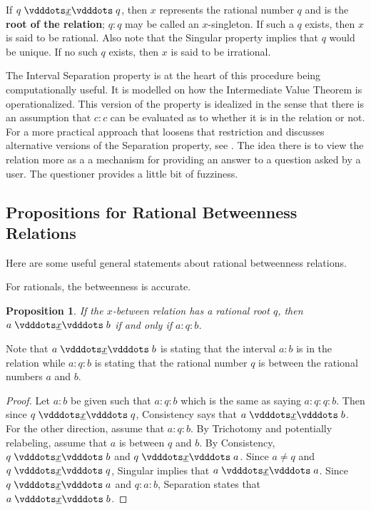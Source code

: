 \documentclass{rmj-public}
\newtheorem{proposition}{Proposition}[section]
\begin{document}
If $q \xrel q$, then $x$ represents the rational number $q$ and is the \textbf{root of the relation}; $q:q$ may be called an $x$-singleton. If such a $q$ exists, then $x$ is said to be rational. Also note that the Singular property implies that $q$ would be unique. If no such $q$ exists, then $x$ is said to be irrational. 

The Interval Separation property is at the heart of this procedure being computationally useful. It is modelled on how the Intermediate Value Theorem is operationalized. This version of the property is idealized in the sense that there is an assumption that $c:c$ can be evaluated as to whether it is in the relation or not. For a more practical approach that loosens that restriction and discusses alternative versions of the Separation property, see \cite{taylor23main}. The idea there is to view the relation more as a a mechanism for providing an answer to a question asked by a user. The questioner provides a little bit of fuzziness. 


\subsection{Propositions for Rational Betweenness Relations}

Here are some useful general statements about rational betweenness relations. 

For rationals, the betweenness is accurate. 

\begin{proposition}\label{br:rooted}
    If the $x$-between relation has a rational root $q$, then $a \xrel b$ if and only if $a : q : b$.
\end{proposition}

Note that $a \xrel b$ is stating that the interval $a:b$ is in the relation while $a:q:b$ is stating that the rational number $q$ is between the rational numbers $a$ and $b$.

\begin{proof}
    Let $a : b$ be given such that $a : q : b$ which is the same as saying $a:q:q:b$. Then since $q \xrel q$, Consistency says that $a \xrel b$. For the other direction, assume that \sout{$a:q:b$}. By Trichotomy and potentially relabeling, assume that $a$ is between $q$ and $b$. By Consistency, $q \xrel b$ and $q\xrel a$.  Since $a \neq q$ and $q \xrel q$, Singular implies that \sout{$a \xrel a$}. Since $q \xrel a$ and $q:a:b$, Separation states that \sout{$ a \xrel b$}. 
\end{proof}
\end{document}

